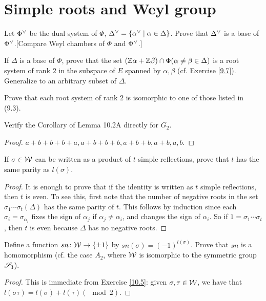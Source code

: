 \section{Simple roots and Weyl group}



\begin{ex}
  Let ${\Phi}^{\vee}$ be the dual system of $\Phi$, ${\Delta}^{\vee} = \{{\alpha}^{\vee}\mid\alpha\in\Delta\}$. Prove that ${\Delta}^{\vee}$ is a base of ${\Phi}^{\vee}$.[Compare Weyl chambers of $\Phi$ and ${\Phi}^{\vee}$.]
\end{ex}

\begin{ex}\label{10.2}
  If $\Delta$ is a base of $\Phi$, prove that the set $({\mathbb Z}\alpha + {\mathbb Z}\beta) \cap \Phi (\alpha\neq\beta\in\Delta)$ is a root system of rank $2$ in the subspace of $E$ spanned by $\alpha,\beta$ (cf. Exercise \ref{9.7}). Generalize to an arbitrary subset of $\Delta$.
\end{ex}

\begin{ex}
  Prove that each root system of rank $2$ is isomorphic to one of those listed in (9.3).
\end{ex}

\begin{ex}
  Verify the Corollary of Lemma 10.2A directly for $G_2$.
\end{ex}
\begin{proof}
  $a+b+b+b+a, a+b+b+b, a+b+b, a+b, a, b$.
\end{proof}

\begin{ex}\label{10.5}
  If $\sigma\in{\cal W}$ can be written as a product of $t$ simple reflections, prove that $t$ has the same parity as $l(\sigma)$.
\end{ex}
\begin{proof}
  It is enough to prove that if the identity is written as $t$ simple reflections, then $t$ is even. To see this, first note that the number of negative roots in the set $\sigma_1\cdots\sigma_t(\Delta)$ has the same parity of $t$. This follows by induction since each $\sigma_i=\sigma_{\alpha_i}$ fixes the sign of $\alpha_j$ if $\alpha_j\neq\alpha_i$, and changes the sign of $\alpha_i$. So if $1=\sigma_1\cdots\sigma_t$, then $t$ is even because $\Delta$ has no negative roots.
\end{proof}

\begin{ex}
  Define a function $sn \colon {\cal W} \to \{\pm1\}$ by $sn(\sigma) = (-1)^{l(\sigma)}$. Prove that $sn$ is a homomorphism (cf. the case $A_2$, where ${\cal W}$ is isomorphic to the symmetric group $\mathscr{S}_3$).
\end{ex}
\begin{proof}
  This is immediate from Exercise \ref{10.5}: given $\sigma,\tau\in{\cal W}$, we have that $l(\sigma\tau)=l(\sigma)+l(\tau) (\mod  2)$.
\end{proof}

